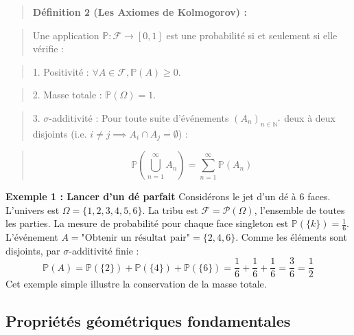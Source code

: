 \documentclass[11pt,a4paper]{article}
\begin{document}
\begin{quote}\textbf{Définition 2 (Les Axiomes de Kolmogorov) :}\end{quote}
\begin{quote}Une application $\mathbb{P} : \mathcal{F} \to [0, 1]$ est une probabilité si et seulement si elle vérifie :\end{quote}
\begin{quote}1. Positivité : $\forall A \in \mathcal{F}, \mathbb{P}(A) \ge 0$.\end{quote}
\begin{quote}2. Masse totale : $\mathbb{P}(\Omega) = 1$.\end{quote}
\begin{quote}3. $\sigma$-additivité : Pour toute suite d'événements $(A_n)_{n \in \mathbb{N}^*}$ deux à deux disjoints (i.e. $i \neq j \implies A_i \cap A_j = \emptyset$) :\end{quote}
\begin{quote}$$ \mathbb{P}\left( \bigcup_{n=1}^\infty A_n \right) = \sum_{n=1}^\infty \mathbb{P}(A_n) $$\end{quote}

\textbf{Exemple 1 : Lancer d'un dé parfait}
Considérons le jet d'un dé à 6 faces. L'univers est $\Omega = \{1, 2, 3, 4, 5, 6\}$.
La tribu est $\mathcal{F} = \mathcal{P}(\Omega)$, l'ensemble de toutes les parties.
La mesure de probabilité pour chaque face singleton est $\mathbb{P}(\{k\}) = \frac{1}{6}$.
L'événement $A = \text{"Obtenir un résultat pair"} = \{2, 4, 6\}$.
Comme les éléments sont disjoints, par $\sigma$-additivité finie :
$$ \mathbb{P}(A) = \mathbb{P}(\{2\}) + \mathbb{P}(\{4\}) + \mathbb{P}(\{6\}) = \frac{1}{6} + \frac{1}{6} + \frac{1}{6} = \frac{3}{6} = \frac{1}{2} $$
Cet exemple simple illustre la conservation de la masse totale.

\subsection{Propriétés géométriques fondamentales}
\end{document}
